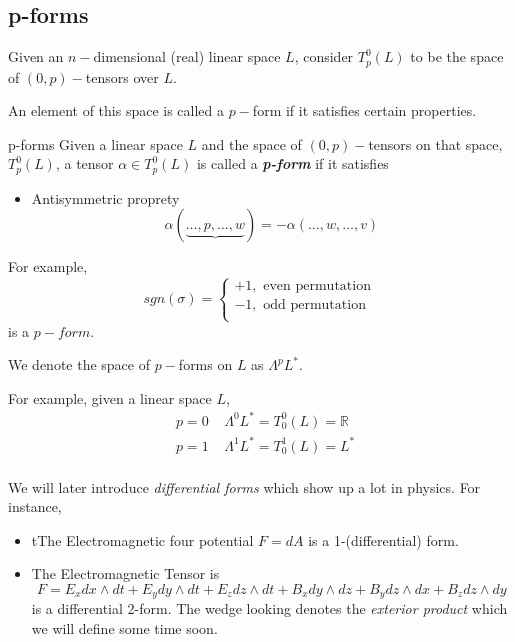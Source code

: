 \documentclass{article}
\newcommand{\R}{\mathbb{R}}
\begin{document}
\vskip 1cm
\subsection{p-forms}

Given an $n-$dimensional (real) linear space $L$, consider $T_{p}^{0}(L)$ to be the space of $(0, p)-$tensors over $L$. 

An element of this space is called a $p-$form if it satisfies certain properties.

\begin{mathdefinitionbox}{p-forms}
  Given a linear space $L$ and the space of $(0, p)-$tensors on that space, $T_p^0(L)$, a tensor $\alpha \in T_p^0(L)$ is called a \emph{\textbf{p-form}} if it satisfies 
  \begin{itemize}
    \item Antisymmetric proprety
    \[ \alpha(\underbrace{\dots, p, \dots, w}_{}) = - \alpha(\dots, w, \dots, v)  \]
  \end{itemize}
\end{mathdefinitionbox}

For example, 
\[ sgn(\sigma) = \begin{cases}
  +1, \text{ even permutation} \\
  -1, \text{ odd permutation} \\
\end{cases} \] 
is a $p-form$.

\vskip 0.5cm
\begin{dottedbox}
  We denote the space of $p-$forms on $L$ as $\Lambda^p L^* $.
\end{dottedbox}

\vskip 0.25cm
For example, given a linear space $L$, 
\begin{align*}
  &p = 0 \;\;\;\; \Lambda^0 L^* = T_0^0(L) = \R \\
  &p = 1 \;\;\;\; \Lambda^1 L^* = T_0^1(L) = L^* \\
\end{align*}


\vskip 1cm
We will later introduce \emph{differential forms} which show up a lot in physics. For instance, 
\begin{itemize}
  \item tThe Electromagnetic four potential $F = dA$ is a 1-(differential) form.
  \item The Electromagnetic Tensor is 
  \[ F = E_x dx \wedge dt + E_y dy \wedge dt + E_z dz \wedge dt + B_x dy \wedge dz + B_y dz \wedge dx + B_z dz \wedge dy\] is a differential 2-form. The wedge looking denotes the \emph{exterior product} which we will define some time soon.
\end{itemize}
\end{document}
